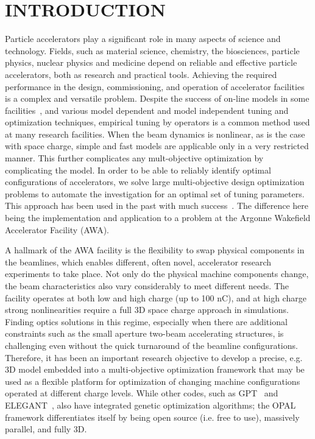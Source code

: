 \documentclass[preprint,linenumbers,amsmath,amssymb,aps,prstab]{revtex4-1}%
\begin{document}
\section{INTRODUCTION} \label{sec:introduction}

Particle accelerators play a significant role in many aspects of science and
  technology.
Fields, such as material science, chemistry, the biosciences, particle
  physics, nuclear physics and medicine depend on reliable and effective
  particle accelerators, both as research and practical tools.
Achieving the required performance in the design, commissioning, and operation
  of accelerator facilities is a complex and versatile problem.
Despite the success of on-line models in some facilities~\cite{xiaobiao}, 
and various model dependent and model independent tuning and optimization techniques, 
empirical tuning by operators is a common method used at many research facilities.
When the beam dynamics is nonlinear, as is the case with space charge, 
simple and fast models are applicable only in a very restricted manner. 
This further complicates any mult-objective optimization by complicating the model. 
In order to be able to reliably identify optimal configurations of
  accelerators, we solve large multi-objective design optimization
  problems to automate the investigation for an optimal set of tuning parameters.
  This approach has been used in the past with much success~\cite{hofler13,bazarov05,yrss:09,jefferson,gull1,gull2,marija}.
The difference here being the implementation and application to a 
problem at the Argonne Wakefield Accelerator Facility (AWA).

A hallmark of the AWA facility is the flexibility to swap physical
components in the beamlines, which enables different, often novel,
accelerator research experiments to take place.  Not only do the
physical machine components change, the beam characteristics also vary
considerably to meet different needs.  The facility operates at both low
and high charge (up to 100 nC), and at high charge strong nonlinearities
require a full 3D space charge approach in simulations.  
Finding optics solutions in this regime, especially when
there are additional constraints such as the small aperture two-beam
accelerating structures, is challenging even without the quick
turnaround of the beamline configurations.  Therefore, it has been an
important research objective to develop a precise, e.g. 3D model
embedded into a multi-objective optimization framework that may be used
as a flexible platform for optimization of changing machine
configurations operated at different charge levels. While other codes,
such as GPT~\cite{gpt} and ELEGANT~\cite{elegant}, also have
integrated genetic optimization algorithms; the OPAL~\cite{opal} framework
differentiates itself by being open source (i.e. free to use), massively
parallel, and fully 3D.
\end{document}
